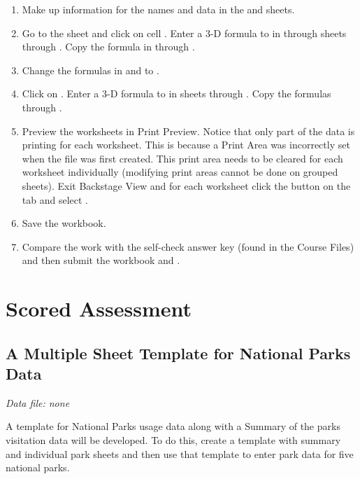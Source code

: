 \begin{enumerate}
	\item Make up information for the names and data in the  and  sheets.
	\item Go to the  sheet and click on cell . Enter a 3-D formula to  in  through sheets  through . Copy the formula in  through .
	\item Change the formulas in  and  to .
	\item Click on . Enter a 3-D formula to  in sheets  through . Copy the formulas through .
	\item Preview the worksheets in Print Preview. Notice that only part of the data is printing for each worksheet. This is because a Print Area was incorrectly set when the file was first created. This print area needs to be cleared for each worksheet individually (modifying print areas cannot be done on grouped sheets). Exit Backstage View and for each worksheet click the  button on the  tab and select .
	\item Save the  workbook.
	\item Compare the work with the self-check answer key (found in the Course Files) and then submit the  workbook and .
\end{enumerate}

\section{Scored Assessment}

\subsection{A Multiple Sheet Template for National Parks Data}

\textit{Data file: none}

A template for National Parks usage data along with a Summary of the parks visitation data will be developed. To do this, create a template with summary and individual park sheets and then use that template to enter park data for five national parks.

